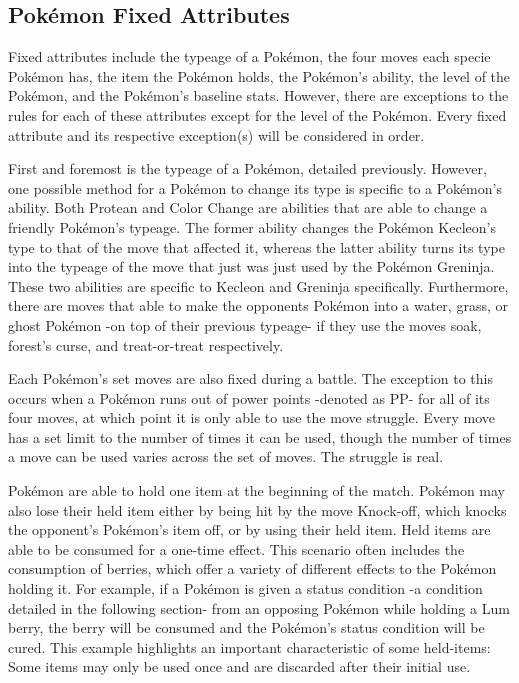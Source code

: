 \documentclass[12pt,twoside]{reedthesis}
\begin{document}
  \subsection{Pokémon Fixed Attributes}\label{pokemon-fixed-attributes}
  
  Fixed attributes include the typeage of a Pokémon, the four moves each
  specie Pokémon has, the item the Pokémon holds, the Pokémon's ability,
  the level of the Pokémon, and the Pokémon's baseline stats. However,
  there are exceptions to the rules for each of these attributes except
  for the level of the Pokémon. Every fixed attribute and its respective
  exception(s) will be considered in order.
  
  First and foremost is the typeage of a Pokémon, detailed previously.
  However, one possible method for a Pokémon to change its type is
  specific to a Pokémon's ability. Both Protean and Color Change are
  abilities that are able to change a friendly Pokémon's typeage. The
  former ability changes the Pokémon Kecleon's type to that of the move
  that affected it, whereas the latter ability turns its type into the
  typeage of the move that just was just used by the Pokémon Greninja.
  These two abilities are specific to Kecleon and Greninja specifically.
  Furthermore, there are moves that able to make the opponents Pokémon
  into a water, grass, or ghost Pokémon -on top of their previous typeage-
  if they use the moves soak, forest's curse, and treat-or-treat
  respectively.
  
  Each Pokémon's set moves are also fixed during a battle. The exception
  to this occurs when a Pokémon runs out of power points -denoted as PP-
  for all of its four moves, at which point it is only able to use the
  move struggle. Every move has a set limit to the number of times it can
  be used, though the number of times a move can be used varies across the
  set of moves. The struggle is real.
  
  Pokémon are able to hold one item at the beginning of the match. Pokémon
  may also lose their held item either by being hit by the move Knock-off,
  which knocks the opponent's Pokémon's item off, or by using their held
  item. Held items are able to be consumed for a one-time effect. This
  scenario often includes the consumption of berries, which offer a
  variety of different effects to the Pokémon holding it. For example, if
  a Pokémon is given a status condition -a condition detailed in the
  following section- from an opposing Pokémon while holding a Lum berry,
  the berry will be consumed and the Pokémon's status condition will be
  cured. This example highlights an important characteristic of some
  held-items: Some items may only be used once and are discarded after
  their initial use.
  
\end{document}

